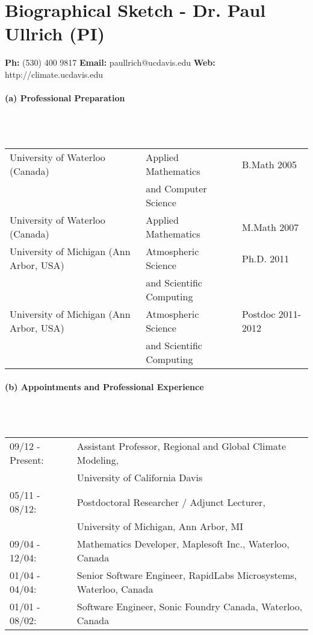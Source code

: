 \documentclass[11pt]{article}
\begin{document}
\appendix

\setcounter{section}{5}

\section{\textbf{Biographical Sketch - Dr. Paul Ullrich (PI)}}
\begin{center}
\textbf{Ph:} (530) 400 9817
\textbf{Email:} paullrich@ucdavis.edu
\textbf{Web:} http://climate.ucdavis.edu
\end{center}
\vspace{-0.8cm}
\paragraph{\large (a) Professional Preparation}\ \\ \ \\
\vspace{-0.8cm}
\begin{tabular*}{\textwidth}{@{\extracolsep{\fill}}lll}
University of Waterloo (Canada) & Applied Mathematics & B.Math 2005 \\
& \qquad and Computer Science & \\
University of Waterloo (Canada) & Applied Mathematics & M.Math 2007 \\
University of Michigan (Ann Arbor, USA) & Atmospheric Science & Ph.D. 2011 \\
& \qquad and Scientific Computing & \\
University of Michigan (Ann Arbor, USA) & Atmospheric Science & Postdoc 2011-2012 \\
& \qquad and Scientific Computing & \\
\end{tabular*}

\vspace{0.8cm}
\paragraph{\large (b) Appointments and Professional Experience}\ \\ \ \\
\vspace{-0.8cm}
\begin{tabular*}{\textwidth}{@{\extracolsep{\fill}}ll}
09/12 - Present: & Assistant Professor, Regional and Global Climate Modeling, \\
& \qquad University of California Davis \\
05/11 - 08/12: & Postdoctoral Researcher / Adjunct Lecturer, \\
& \qquad University of Michigan, Ann Arbor, MI \\
09/04 - 12/04: & Mathematics Developer, Maplesoft Inc., Waterloo, Canada \\
01/04 - 04/04: & Senior Software Engineer, RapidLabs Microsystems, Waterloo, Canada \\
01/01 - 08/02: & Software Engineer, Sonic Foundry Canada, Waterloo, Canada
\end{tabular*}
\end{document}
